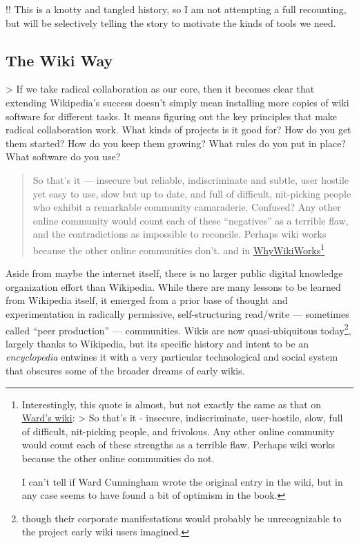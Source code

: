 \documentclass[10pt]{tufte-book}
\begin{document}
!! This is a knotty and tangled history, so I am not attempting a full
recounting, but will be selectively telling the story to motivate the
kinds of tools we need.






\subsection{The Wiki Way}



 \textgreater{} If we take radical collaboration as our
core, then it becomes clear that extending Wikipedia's success doesn't
simply mean installing more copies of wiki software for different tasks.
It means figuring out the key principles that make radical collaboration
work. What kinds of projects is it good for? How do you get them
started? How do you keep them growing? What rules do you put in place?
What software do you use? \citep{swartzMakingMoreWikipedias2006} 

\begin{quote}
So that's it --- insecure but reliable, indiscriminate and subtle, user
hostile yet easy to use, slow but up to date, and full of difficult,
nit-picking people who exhibit a remarkable community camaraderie.
Confused? Any other online community would count each of these
``negatives'' as a terrible flaw, and the contradictions as impossible
to reconcile. Perhaps wiki works because the other online communities
don't. \citep{leufWikiWayQuick2001a, -l, 329}  and in
\href{http://wiki.c2.com/?WhyWikiWorks}{WhyWikiWorks}\footnote{Interestingly,
  this quote is almost, but not exactly the same as that on
  \href{http://wiki.c2.com/?WhyWikiWorks}{Ward's wiki}: \textgreater{}
  So that's it - insecure, indiscriminate, user-hostile, slow, full of
  difficult, nit-picking people, and frivolous. Any other online
  community would count each of these strengths as a terrible flaw.
  Perhaps wiki works because the other online communities do not.

  I can't tell if Ward Cunningham wrote the original entry in the wiki,
  but in any case seems to have found a bit of optimism in the book.}
\end{quote}

Aside from maybe the internet itself, there is no larger public digital
knowledge organization effort than Wikipedia. While there are many
lessons to be learned from Wikipedia itself, it emerged from a prior
base of thought and experimentation in radically permissive,
self-structuring read/write --- sometimes called ``peer production''
\citep{hillWikipediaEndOpen2019}  --- communities. Wikis are now
quasi-ubiquitous today\footnote{though their corporate manifestations
  would probably be unrecognizable to the project early wiki users
  imagined.}, largely thanks to Wikipedia, but its specific history and
intent to be an \emph{encyclopedia} entwines it with a very particular
technological and social system that obscures some of the broader dreams
of early wikis.
\end{document}
